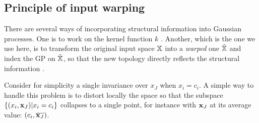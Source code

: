 %  
% 
% 
%  
% 
% 
% 

\subsection{Principle of input warping}
There are several ways of incorporating structural information into Gaussian processes. 
One is to work on the kernel function $k$ \cite{ginsbourger2013kernels,duvenaud2014automatic}.
Another, which is the one we use here, is to transform the original input space $\mathbb{X}$ into a \textit{warped} one $\tilde {\mathbb{X}}$ 
and index the GP on $\tilde {\mathbb{X}}$, so that the new topology directly reflects the structural information \cite{snoek2014input,marmin2018warped}.

Consider for simplicity a single invariance over $x_J$ when $x_i = c_i$. 
A simple way to handle this problem is to distort locally the space so that the subspace $\{(x_i, \mathbf{x}_J) | x_i = c_i\}$ collapses to a single point,
for instance with $\mathbf{x}_J$ at its average value: $(c_i, \overline{\mathbf{x}_J})$.

